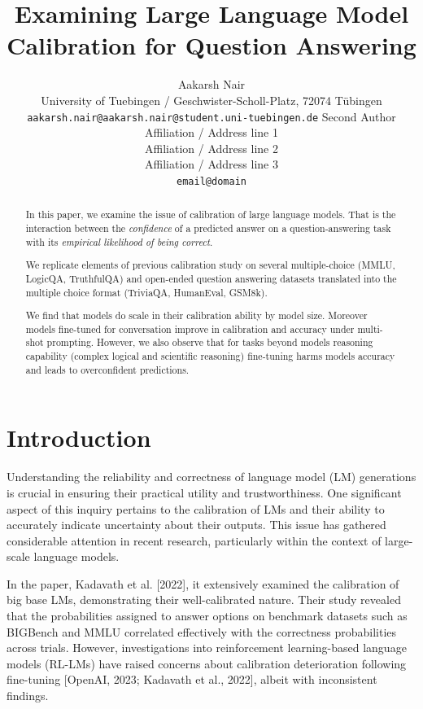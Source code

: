 \documentclass[11pt]{article}
\title{Examining Large Language Model Calibration for Question Answering}
\author{Aakarsh Nair\\
  University of Tuebingen / Geschwister-Scholl-Platz, 72074 Tübingen\\
  \texttt{aakarsh.nair@aakarsh.nair@student.uni-tuebingen.de} 
  Second Author \\
  Affiliation / Address line 1 \\
  Affiliation / Address line 2 \\
  Affiliation / Address line 3 \\
  \texttt{email@domain} \\}
\begin{document}
\maketitle

\begin{abstract}
In this paper, we examine the issue of calibration of large language models. 
That is the interaction between the \emph{confidence} of a predicted answer 
on a question-answering task with its \emph{empirical likelihood 
of being correct}.

We replicate elements of previous calibration study \cite{kadavath2022language} 
on several multiple-choice  (MMLU, LogicQA, TruthfulQA) and 
open-ended question answering datasets translated into 
the multiple choice format (TriviaQA, HumanEval, GSM8k). 

We find that models do scale in their calibration ability by model size. 
Moreover models fine-tuned for conversation improve 
in calibration and accuracy under multi-shot prompting. 
However, we also observe that for tasks beyond models reasoning 
capability (complex logical and scientific reasoning) 
fine-tuning harms models accuracy and leads to overconfident 
predictions.
\end{abstract}


\section{Introduction}

Understanding the reliability and correctness of language model (LM) generations is crucial in ensuring their practical utility and trustworthiness. One significant aspect of this inquiry pertains to the calibration of LMs and their ability to accurately indicate uncertainty about their outputs. This issue has gathered considerable attention in recent research, particularly within the context of large-scale language models.

In the paper, Kadavath et al. [2022], it extensively examined the calibration of big base LMs, demonstrating their well-calibrated nature. Their study revealed that the probabilities assigned to answer options on benchmark datasets such as BIGBench and MMLU correlated effectively with the correctness probabilities across trials. However, investigations into reinforcement learning-based language models (RL-LMs) have raised concerns about calibration deterioration following fine-tuning [OpenAI, 2023; Kadavath et al., 2022], albeit with inconsistent findings.
\end{document}
